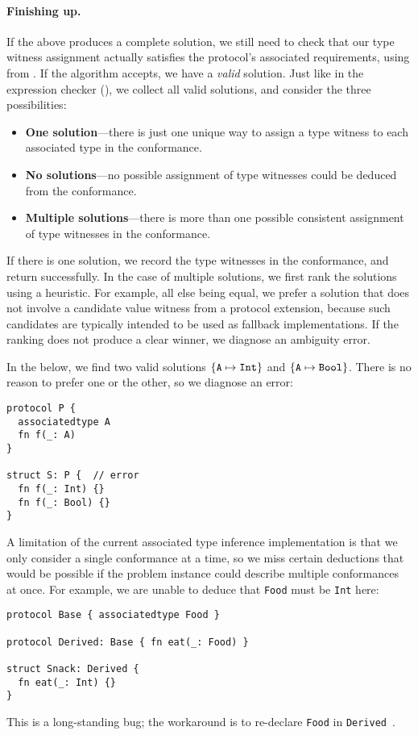 \documentclass[../generics]{subfiles}
\begin{document}
\paragraph{Finishing up.}
If the above produces a complete solution, we still need to check that our type witness assignment actually satisfies the protocol's associated requirements, using  from . If the algorithm accepts, we have a \emph{valid} solution. Just like in the expression checker (), we collect all valid solutions, and consider the three possibilities:
\begin{itemize}
\item \textbf{One solution}---there is just one unique way to assign a type witness to each associated type in the conformance.
\item \textbf{No solutions}---no possible assignment of type witnesses could be deduced from the conformance.
\item \textbf{Multiple solutions}---there is more than one possible consistent assignment of type witnesses in the conformance.
\end{itemize}
If there is one solution, we record the type witnesses in the conformance, and return successfully. In the case of multiple solutions, we first rank the solutions using a heuristic. For example, all else being equal, we prefer a solution that does not involve a candidate value witness from a protocol extension, because such candidates are typically intended to be used as fallback implementations. If the ranking does not produce a clear winner, we diagnose an ambiguity error.

\begin{example}\label{ambiguous associated type example}
In the below, we find two valid solutions $\{\texttt{A} \mapsto \texttt{Int}\}$ and $\{\texttt{A} \mapsto \texttt{Bool}\}$. There is no reason to prefer one or the other, so we diagnose an error:
\begin{Verbatim}
protocol P {
  associatedtype A
  fn f(_: A)
}

struct S: P {  // error
  fn f(_: Int) {}
  fn f(_: Bool) {}
}
\end{Verbatim}
\end{example}

\begin{example}
A limitation of the current associated type inference implementation is that we only consider a single conformance at a time, so we miss certain deductions that would be possible if the problem instance could describe multiple conformances at once. For example, we are unable to deduce that \texttt{Food} must be \texttt{Int} here:
\begin{Verbatim}
protocol Base { associatedtype Food }

protocol Derived: Base { fn eat(_: Food) }

struct Snack: Derived {
  fn eat(_: Int) {}
}
\end{Verbatim}
This is a long-standing bug; the workaround is to re-declare \texttt{Food} in \texttt{Derived}~\cite{sr2235}. 
\end{example}
\end{document}
